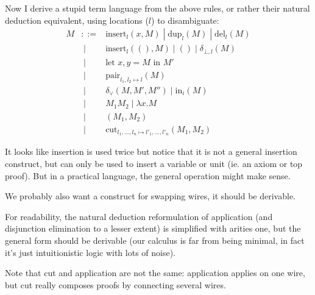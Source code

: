 \documentclass{article}
\renewcommand{\|}{\; | \;}
\begin{document}
Now I derive a stupid term language from the above rules,
or rather their natural deduction equivalent,
using locations ($l$) to disambiguate:
\begin{eqnarray*}
 M &::=& \text{insert}_l(x,M) \| \text{dup}_l(M) \| \text{del}_l(M) \\
   &\|& \text{insert}_l((),M) \| () \| \delta_{\bot,l}(M) \\
   &\|& \text{let } x,y = M \text{ in } M' \\
   &\|& \text{pair}_{l_1,l_2\mapsto l}(M) \\
   &\|& \delta_\vee(M,M',M'') \| \text{in}_i(M) \\
   &\|& M_1 M_2 \| \lambda x. M \\
   &\|& (M_1,M_2) \\
   &\|& \text{cut}_{l_1,\ldots,l_n\mapsto l'_1,\ldots,l'_n}(M_1,M_2)
\end{eqnarray*}

It looks like insertion is used twice but notice that it is not a general
insertion construct, but can only be used to insert a variable or unit
(ie. an axiom or top proof).
But in a practical language, the general operation might make sense.

We probably also want a construct for swapping wires,
it should be derivable.

For readability,
the natural deduction reformulation of application (and disjunction 
elimination to a lesser extent) is simplified with arities one,
but the general form should
be derivable (our calculus is far from being minimal, in fact it's just
intuitionistic logic with lots of noise).

Note that cut and application are not the same: application applies on one
wire, but cut really composes proofs by connecting several wires.
\end{document}
